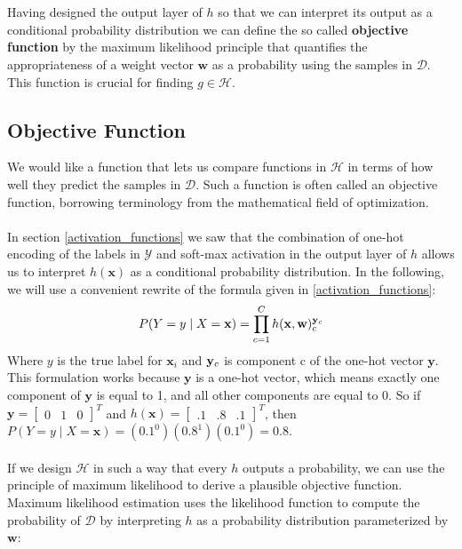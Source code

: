 \\\\
Having designed the output layer of $h$ so that we can interpret its output as a conditional probability distribution we can define the so called \textbf{objective function} by the maximum likelihood principle that quantifies the appropriateness of a weight vector $\mathbf{w}$ as a probability using the samples in $\mathcal{D}$. This function is crucial for finding $g \in \mathcal{H}$.

\subsection{Objective Function}
\label{objectiveFunction}
We would like a function that lets us compare functions in $\mathcal{H}$ in terms of how well they predict the samples in $\mathcal{D}$. Such a function is often called an objective function, borrowing terminology from the mathematical field of optimization.
\\\\
In section \ref{activation_functions} we saw that the combination of one-hot encoding of the labels in $\mathcal{Y}$ and soft-max activation in the output layer of $h$ allows us to interpret $h(\mathbf{x})$ as a conditional probability distribution. In the following, we will use a convenient rewrite of the formula given in \ref{activation_functions}:
$$
P(Y = y \mid X = \mathbf{x}) = \prod\limits_{c=1}^C h(\mathbf{x},\mathbf{w})^{\mathbf{y}_c}_c
$$
Where $y$ is the true label for $\mathbf{x}_i$ and $\mathbf{y}_c$ is component c of the one-hot vector $\mathbf{y}$. 
This formulation works because $\mathbf{y}$ is a one-hot vector, which means exactly one component of $\mathbf{y}$ is equal to 1, and all other components are equal to 0. So if $\mathbf{y} = \begin{bmatrix}0 & 1 & 0 \end{bmatrix}^T$ and $h(\mathbf{x}) = \begin{bmatrix}.1 & .8 & .1 \end{bmatrix}^T$, then $P(Y = y \mid X = \mathbf{x}) = (0.1^0)(0.8^1)(0.1^0) = 0.8$.
\\\\
If we design $\mathcal{H}$ in such a way that every $h$ outputs a probability, we can use the principle of maximum likelihood to derive a plausible objective function. Maximum likelihood estimation uses the likelihood function to compute the probability of $\mathcal{D}$ by interpreting $h$ as a probability distribution parameterized by $\mathbf{w}$:

